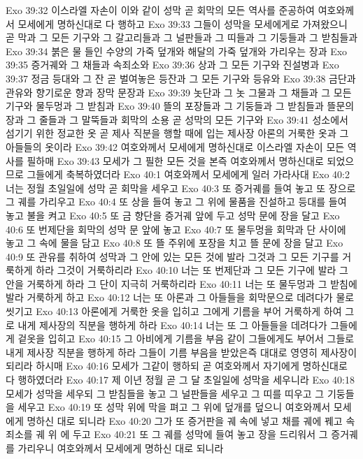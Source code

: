 Exo 39:32  이스라엘 자손이 이와 같이 성막 곧 회막의 모든 역사를 준공하여 여호와께서 모세에게 명하신대로 다 행하고
Exo 39:33  그들이 성막을 모세에게로 가져왔으니 곧 막과 그 모든 기구와 그 갈고리들과 그 널판들과 그 띠들과 그 기둥들과 그 받침들과
Exo 39:34  붉은 물 들인 수양의 가죽 덮개와 해달의 가죽 덮개와 가리우는 장과
Exo 39:35  증거궤와 그 채들과 속죄소와
Exo 39:36  상과 그 모든 기구와 진설병과
Exo 39:37  정금 등대와 그 잔 곧 벌여놓은 등잔과 그 모든 기구와 등유와
Exo 39:38  금단과 관유와 향기로운 향과 장막 문장과
Exo 39:39  놋단과 그 놋 그물과 그 채들과 그 모든 기구와 물두멍과 그 받침과
Exo 39:40  뜰의 포장들과 그 기둥들과 그 받침들과 뜰문의 장과 그 줄들과 그 말뚝들과 회막의 소용 곧 성막의 모든 기구와
Exo 39:41  성소에서 섬기기 위한 정교한 옷 곧 제사 직분을 행할 때에 입는 제사장 아론의 거룩한 옷과 그 아들들의 옷이라
Exo 39:42  여호와께서 모세에게 명하신대로 이스라엘 자손이 모든 역사를 필하매
Exo 39:43  모세가 그 필한 모든 것을 본즉 여호와께서 명하신대로 되었으므로 그들에게 축복하였더라
Exo 40:1  여호와께서 모세에게 일러 가라사대
Exo 40:2  너는 정월 초일일에 성막 곧 회막을 세우고
Exo 40:3  또 증거궤를 들여 놓고 또 장으로 그 궤를 가리우고
Exo 40:4  또 상을 들여 놓고 그 위에 물품을 진설하고 등대를 들여 놓고 불을 켜고
Exo 40:5  또 금 향단을 증거궤 앞에 두고 성막 문에 장을 달고
Exo 40:6  또 번제단을 회막의 성막 문 앞에 놓고
Exo 40:7  또 물두멍을 회막과 단 사이에 놓고 그 속에 물을 담고
Exo 40:8  또 뜰 주위에 포장을 치고 뜰 문에 장을 달고
Exo 40:9  또 관유를 취하여 성막과 그 안에 있는 모든 것에 발라 그것과 그 모든 기구를 거룩하게 하라 그것이 거룩하리라
Exo 40:10  너는 또 번제단과 그 모든 기구에 발라 그 안을 거룩하게 하라 그 단이 지극히 거룩하리라
Exo 40:11  너는 또 물두멍과 그 받침에 발라 거룩하게 하고
Exo 40:12  너는 또 아론과 그 아들들을 회막문으로 데려다가 물로 씻기고
Exo 40:13  아론에게 거룩한 옷을 입히고 그에게 기름을 부어 거룩하게 하여 그로 내게 제사장의 직분을 행하게 하라
Exo 40:14  너는 또 그 아들들을 데려다가 그들에게 겉옷을 입히고
Exo 40:15  그 아비에게 기름을 부음 같이 그들에게도 부어서 그들로 내게 제사장 직분을 행하게 하라 그들이 기름 부음을 받았은즉 대대로 영영히 제사장이 되리라 하시매
Exo 40:16  모세가 그같이 행하되 곧 여호와께서 자기에게 명하신대로 다 행하였더라
Exo 40:17  제 이년 정월 곧 그 달 초일일에 성막을 세우니라
Exo 40:18  모세가 성막을 세우되 그 받침들을 놓고 그 널판들을 세우고 그 띠를 띠우고 그 기둥들을 세우고
Exo 40:19  또 성막 위에 막을 펴고 그 위에 덮개를 덮으니 여호와께서 모세에게 명하신 대로 되니라
Exo 40:20  그가 또 증거판을 궤 속에 넣고 채를 궤에 꿰고 속죄소를 궤 위 에 두고
Exo 40:21  또 그 궤를 성막에 들여 놓고 장을 드리워서 그 증거궤를 가리우니 여호와께서 모세에게 명하신 대로 되니라

